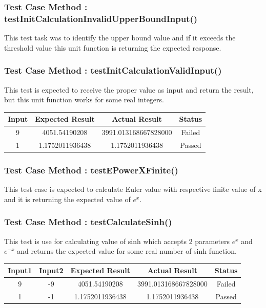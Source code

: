 \documentclass[a4paper,11pt]{report}
\begin{document}
\subsubsection{Test Case Method : testInitCalculationInvalidUpperBoundInput()}
This test task was to identify the upper bound value and if it exceeds the threshold value this unit function is returning the expected response.
\subsubsection{Test Case Method : testInitCalculationValidInput() }
This test is expected to receive the proper value as input and return the result, but this unit function works for some real integers.
\begin{center}
\begin{tabular}{ |c|c|c|c| } 
\hline
\textbf{Input} & \textbf{Expected Result} & \textbf{Actual Result} & \textbf{Status} \\
\hline
9 & 4051.54190208 & 3991.013168667828000 & Failed \\ 
\hline
1 & 1.1752011936438 & 1.1752011936438 & Passed \\ 
\hline
\end{tabular}
\end{center}
\subsubsection{Test Case Method : testEPowerXFinite()}
This test case is expected to calculate Euler value with respective finite value of x and it is returning the expected value of $e^x$.
\subsubsection{Test Case Method : testCalculateSinh() }
This test is use for calculating value of sinh which accepts 2 parameters $e^x$ and $e^{-x}$ and returns the expected value for some real number of sinh function.
\begin{center}
\begin{tabular}{ |c|c|c|c|c| } 
\hline
\textbf{Input1} & \textbf{Input2} & \textbf{Expected Result} & \textbf{Actual Result} & \textbf{Status} \\
\hline
9 & -9 & 4051.54190208 & 3991.013168667828000 & Failed \\ 
\hline
1 & -1 & 1.1752011936438 & 1.1752011936438 & Passed \\ 
\hline
\end{tabular}
\end{center}
\end{document}
